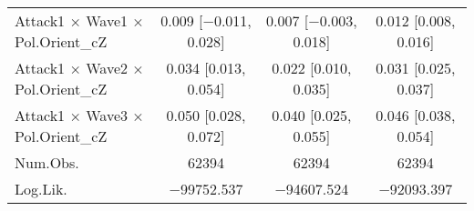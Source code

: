 \begin{table}
\begin{tabular}[t]{lccc}
Attack1 × Wave1 × Pol.Orient\_cZ & \num{0.009} [\num{-0.011}, \num{0.028}] & \num{0.007} [\num{-0.003}, \num{0.018}] & \num{0.012} [\num{0.008}, \num{0.016}]\\
Attack1 × Wave2 × Pol.Orient\_cZ & \num{0.034} [\num{0.013}, \num{0.054}] & \num{0.022} [\num{0.010}, \num{0.035}] & \num{0.031} [\num{0.025}, \num{0.037}]\\
Attack1 × Wave3 × Pol.Orient\_cZ & \num{0.050} [\num{0.028}, \num{0.072}] & \num{0.040} [\num{0.025}, \num{0.055}] & \num{0.046} [\num{0.038}, \num{0.054}]\\
\midrule
Num.Obs. & \num{62394} & \num{62394} & \num{62394}\\
Log.Lik. & \num{-99752.537} & \num{-94607.524} & \num{-92093.397}\\
\bottomrule
\end{tabular}
\end{table}
